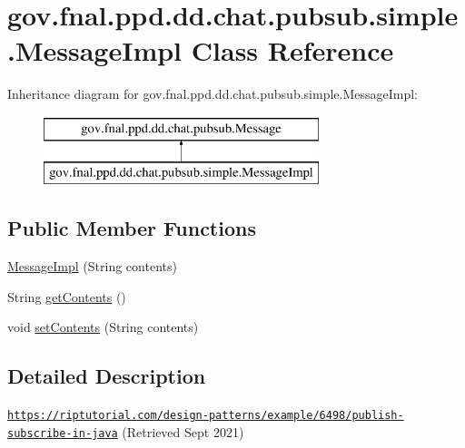 \hypertarget{classgov_1_1fnal_1_1ppd_1_1dd_1_1chat_1_1pubsub_1_1simple_1_1MessageImpl}{\section{gov.\-fnal.\-ppd.\-dd.\-chat.\-pubsub.\-simple.\-Message\-Impl Class Reference}
\label{classgov_1_1fnal_1_1ppd_1_1dd_1_1chat_1_1pubsub_1_1simple_1_1MessageImpl}
}
Inheritance diagram for gov.\-fnal.\-ppd.\-dd.\-chat.\-pubsub.\-simple.\-Message\-Impl\-:\begin{figure}[H]
\begin{center}
\leavevmode
\includegraphics[height=2.000000cm]{classgov_1_1fnal_1_1ppd_1_1dd_1_1chat_1_1pubsub_1_1simple_1_1MessageImpl}
\end{center}
\end{figure}
\subsection*{Public Member Functions}
\begin{DoxyCompactItemize}
\item 
\hyperlink{classgov_1_1fnal_1_1ppd_1_1dd_1_1chat_1_1pubsub_1_1simple_1_1MessageImpl_a0996d48b06465583259f086d7d9191f9}{Message\-Impl} (String contents)
\item 
String \hyperlink{classgov_1_1fnal_1_1ppd_1_1dd_1_1chat_1_1pubsub_1_1simple_1_1MessageImpl_a3fd046598139425015e32ebaad833cbd}{get\-Contents} ()
\item 
void \hyperlink{classgov_1_1fnal_1_1ppd_1_1dd_1_1chat_1_1pubsub_1_1simple_1_1MessageImpl_aefe7915646e63465acef02e7595829f5}{set\-Contents} (String contents)
\end{DoxyCompactItemize}


\subsection{Detailed Description}
\href{https://riptutorial.com/design-patterns/example/6498/publish-subscribe-in-java}{\tt https\-://riptutorial.\-com/design-\/patterns/example/6498/publish-\/subscribe-\/in-\/java} (Retrieved Sept 2021)

